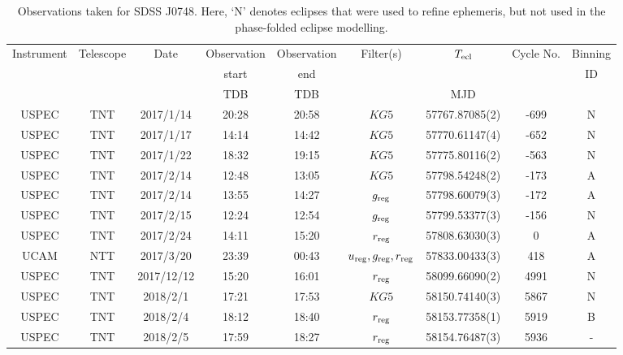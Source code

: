 \begin{table}
	\begin{center}
		\caption{Observations taken for SDSS J0748. Here, `N' denotes eclipses that were used to refine ephemeris, but not used in the phase-folded eclipse modelling.}
		\label{table:observing:observation logs SDSS0748}
		\begin{tabular}{ccccccccc}
			\hline
			Instrument & Telescope & Date & Observation  & Observation  & Filter(s) & $T_{\rm ecl}$ & Cycle No. & Binning \\
			 &  &  &  start &  end &  &  &  & ID \\
			 &  &  & TDB & TDB &  & MJD &  &  \\
			\hline
			\hline
			USPEC & TNT     & 2017/1/14  & 20:28 & 20:58 & $KG5$                                 & 57767.87085(2) &  -699 & N \\
			USPEC & TNT     & 2017/1/17  & 14:14 & 14:42 & $KG5$                                 & 57770.61147(4) &  -652 & N \\
			USPEC & TNT     & 2017/1/22  & 18:32 & 19:15 & $KG5$                                 & 57775.80116(2) &  -563 & N \\
			USPEC & TNT     & 2017/2/14  & 12:48 & 13:05 & $KG5$                                 & 57798.54248(2) &  -173 & A \\
			USPEC & TNT     & 2017/2/14  & 13:55 & 14:27 & $g_{\rm reg}$                         & 57798.60079(3) &  -172 & A \\
			USPEC & TNT     & 2017/2/15  & 12:24 & 12:54 & $g_{\rm reg}$                         & 57799.53377(3) &  -156 & N \\
			USPEC & TNT     & 2017/2/24  & 14:11 & 15:20 & $r_{\rm reg}$                         & 57808.63030(3) &     0 & A \\
			UCAM  & NTT     & 2017/3/20  & 23:39 & 00:43 & $u_{\rm reg},g_{\rm reg},r_{\rm reg}$ & 57833.00433(3) &   418 & A \\
			USPEC & TNT     & 2017/12/12 & 15:20 & 16:01 & $r_{\rm reg}$                         & 58099.66090(2) &  4991 & N \\
			USPEC & TNT     & 2018/2/1   & 17:21 & 17:53 & $KG5$                                 & 58150.74140(3) &  5867 & N \\
			USPEC & TNT     & 2018/2/4   & 18:12 & 18:40 & $r_{\rm reg}$                         & 58153.77358(1) &  5919 & B \\
			USPEC & TNT     & 2018/2/5   & 17:59 & 18:27 & $r_{\rm reg}$                         & 58154.76487(3) &  5936 & - \\

\end{tabular}
\end{center}
\end{table}

